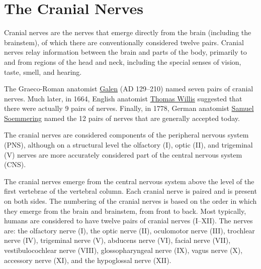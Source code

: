 \hypertarget{the-cranial-nerves}{%
\section{The Cranial Nerves}\label{the-cranial-nerves}}

Cranial nerves are the nerves that emerge directly from the brain (including the brainstem), of which there are conventionally considered twelve pairs. Cranial nerves relay information between the brain and parts of the body, primarily to and from regions of the head and neck, including the special senses of vision, taste, smell, and hearing.

The Graeco-Roman anatomist \href{https://en.wikipedia.org/wiki/Galen}{Galen} (AD 129--210) named seven pairs of cranial nerves. Much later, in 1664, English anatomist \href{https://en.wikipedia.org/wiki/Thomas_Willis}{Thomas Willis} suggested that there were actually 9 pairs of nerves. Finally, in 1778, German anatomist \href{https://en.wikipedia.org/wiki/Samuel_Thomas_von_Sömmerring}{Samuel Soemmering} named the 12 pairs of nerves that are generally accepted today.

The cranial nerves are considered components of the peripheral nervous system (PNS), although on a structural level the olfactory (I), optic (II), and trigeminal (V) nerves are more accurately considered part of the central nervous system (CNS).

The cranial nerves emerge from the central nervous system above the level of the first vertebrae of the vertebral column. Each cranial nerve is paired and is present on both sides. The numbering of the cranial nerves is based on the order in which they emerge from the brain and brainstem, from front to back. Most typically, humans are considered to have twelve pairs of cranial nerves (I--XII). The nerves are: the olfactory nerve (I), the optic nerve (II), oculomotor nerve (III), trochlear nerve (IV), trigeminal nerve (V), abducens nerve (VI), facial nerve (VII), vestibulocochlear nerve (VIII), glossopharyngeal nerve (IX), vagus nerve (X), accessory nerve (XI), and the hypoglossal nerve (XII).



